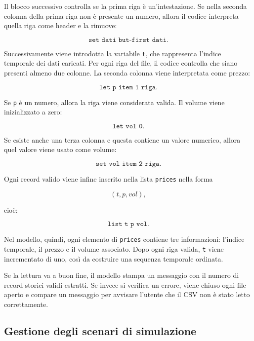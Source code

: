 Il blocco successivo controlla se la prima riga è un'intestazione. Se nella
seconda colonna della prima riga non è presente un numero, allora il codice
interpreta quella riga come header e la rimuove:

\[
\texttt{set dati but-first dati}.
\]

Successivamente viene introdotta la variabile \texttt{t}, che rappresenta
l'indice temporale dei dati caricati. Per ogni riga del file, il codice controlla
che siano presenti almeno due colonne. La seconda colonna viene interpretata come
prezzo:

\[
\texttt{let p item 1 riga}.
\]

Se \texttt{p} è un numero, allora la riga viene considerata valida. Il volume
viene inizializzato a zero:

\[
\texttt{let vol 0}.
\]

Se esiste anche una terza colonna e questa contiene un valore numerico, allora
quel valore viene usato come volume:

\[
\texttt{set vol item 2 riga}.
\]

Ogni record valido viene infine inserito nella lista \texttt{prices} nella forma

\[
(t, p, vol),
\]

cioè:

\[
\texttt{list t p vol}.
\]

Nel modello, quindi, ogni elemento di \texttt{prices} contiene tre informazioni:
l'indice temporale, il prezzo e il volume associato. Dopo ogni riga valida,
\texttt{t} viene incrementato di uno, così da costruire una sequenza temporale
ordinata.

Se la lettura va a buon fine, il modello stampa un messaggio con il numero di
record storici validi estratti. Se invece si verifica un errore, viene chiuso ogni
file aperto e compare un messaggio per avvisare l'utente che il CSV non è stato
letto correttamente.

\subsection{Gestione degli scenari di simulazione}

